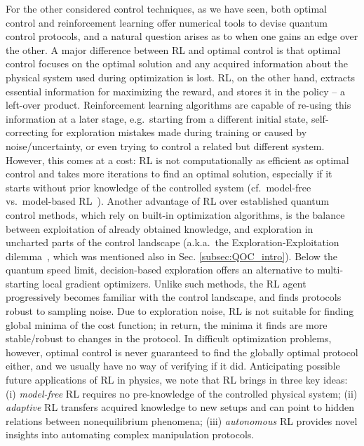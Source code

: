 For the other considered control techniques, as we have seen, both optimal control and reinforcement learning offer numerical tools to devise quantum control protocols, and a natural question arises as to when one gains an edge over the other. A major difference between RL and optimal control is that optimal control focuses on the optimal solution and any acquired information about the physical system used during optimization is lost. RL, on the other hand, extracts essential information for maximizing the reward, and stores it in the policy -- a left-over product. Reinforcement learning algorithms are capable of re-using this information at a later stage, e.g.~starting from a different initial state, self-correcting for exploration mistakes made during training or caused by noise/uncertainty, or even trying to control a related but different system. However, this comes at a cost: RL is not computationally as efficient as optimal control and takes more iterations to find an optimal solution, especially if it starts without prior knowledge of the controlled system (cf.~model-free vs.~model-based RL~\cite{sutton_barto_rl}). Another advantage of RL over established quantum control methods, which rely on built-in optimization algorithms, is the balance between exploitation of already obtained knowledge, and exploration in uncharted parts of the control landscape (a.k.a.~the Exploration-Exploitation dilemma~\cite{sutton_barto_rl}, which was mentioned also in Sec. \ref{subsec:QOC_intro}). Below the quantum speed limit, decision-based exploration offers an alternative to multi-starting local gradient optimizers. Unlike such methods, the RL agent progressively becomes familiar with the control landscape, and finds protocols robust to sampling noise. Due to exploration noise, RL is not suitable for finding global minima of the cost function; in return, the minima it finds are more stable/robust to changes in the protocol. In difficult optimization problems, however, optimal control is never guaranteed to find the globally optimal protocol either, and we usually have no way of verifying if it did. Anticipating possible future applications of RL in physics, we note that RL brings in three key ideas:
(i) \emph{model-free} RL requires no pre-knowledge of the controlled physical system;
(ii) \emph{adaptive} RL transfers acquired knowledge to new setups and can point to hidden relations between nonequilibrium phenomena;
(iii) \emph{autonomous} RL provides novel insights into automating complex manipulation protocols. \\

